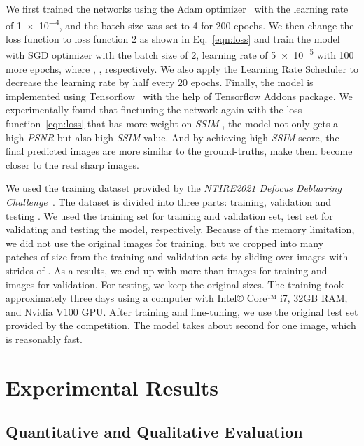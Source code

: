 \documentclass[final]{cvpr}
\begin{document}
We first trained the networks using the Adam optimizer~\cite{adam} with the learning rate of \num{1e-4}, and the batch size was set to 4 for 200 epochs. We then change the loss function to loss function 2 as shown in Eq.~\ref{eqn:loss} and train the model with SGD optimizer with the batch size of 2, learning rate of \num{5e-5} with 100 more epochs, where , , respectively. We also apply the Learning Rate Scheduler to decrease the learning rate by half every 20 epochs. Finally, the model is implemented using Tensorflow~\cite{tf} with the help of Tensorflow Addons package. We experimentally found that finetuning the network again with the loss function~\ref{eqn:loss} that has more weight on \textit{SSIM} , the model not only gets a high \textit{PSNR} but also high \textit{SSIM} value. And by achieving high \textit{SSIM} score, the final predicted images are more similar to the ground-truths, make them become closer to the real sharp images.

We used the training dataset provided by the \textit{NTIRE2021 Defocus Deblurring Challenge~\cite{ntire}}. The dataset is divided into three parts: training, validation and testing . We used the training set for training and validation set, test set for validating and testing the model, respectively. Because of the memory limitation, we did not use the original images for training, but we cropped into many patches of size  from the training and validation sets by sliding over images with strides of . As a results, we end up with more than  images for training and  images for validation. For testing, we keep the original sizes. The training took approximately three days using a computer with Intel® Core™ i7, 32GB RAM, and Nvidia V100 GPU. After training and fine-tuning, we use the original test set provided by the competition. The model takes about  second for one image, which is reasonably fast.



\section{Experimental Results}
\subsection{Quantitative and Qualitative Evaluation}
\end{document}
